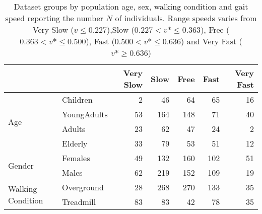\begin{table}
\centering
\caption{Dataset groups by population age, sex, walking condition and gait speed reporting the number $N$ of individuals. Range speeds varies from Very Slow ($v \leq 0.227$),Slow ($0.227 < v* \leq 0.363$), Free ($0.363 < v* \leq 0.500$), Fast ($0.500 < v* \leq  0.636$) and Very Fast ($v* \geq 0.636$)}
\label{tab:table1}
\begin{tabular}{llrrrrr}
\toprule
                  &           &  Very Slow &       Slow &       Free &       Fast &  Very Fast \\
\midrule
\multirow{4}{*}{Age} & Children &          2 &         46 &         64 &         65 &         16 \\
                  & YoungAdults &         53 &        164 &        148 &         71 &         40 \\
                  & Adults &         23 &         62 &         47 &         24 &          2 \\
                  & Elderly &         33 &         79 &         53 &         51 &         12 \\
\cline{1-7}
\multirow{2}{*}{Gender} & Females &         49 &        132 &        160 &        102 &         51 \\
                  & Males &         62 &        219 &        152 &        109 &         19 \\
\cline{1-7}
\multirow{2}{*}{Walking Condition} & Overground &         28 &        268 &        270 &        133 &         35 \\
                  & Treadmill &         83 &         83 &         42 &         78 &         35 \\
\bottomrule
\end{tabular}
\end{table}
